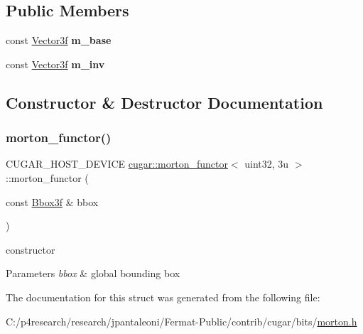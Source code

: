 \subsection*{Public Members}
\begin{DoxyCompactItemize}
\item 
\mbox{\label{structcugar_1_1morton__functor_3_01uint32_00_013u_01_4_acd1acc13bc54e7ed5dc75fe6872ea278}} 
const \hyperlink{structcugar_1_1_vector}{Vector3f} {\bfseries m\+\_\+base}
\item 
\mbox{\label{structcugar_1_1morton__functor_3_01uint32_00_013u_01_4_ad7f31dbe6a8ab5dc44af24459f0d9465}} 
const \hyperlink{structcugar_1_1_vector}{Vector3f} {\bfseries m\+\_\+inv}
\end{DoxyCompactItemize}


\subsection{Constructor \& Destructor Documentation}
\mbox{\label{structcugar_1_1morton__functor_3_01uint32_00_013u_01_4_a6bca6785e96ad7ee48e551cebcbaa48a}} 
\subsubsection{\texorpdfstring{morton\+\_\+functor()}{morton\_functor()}}
{\footnotesize\ttfamily C\+U\+G\+A\+R\+\_\+\+H\+O\+S\+T\+\_\+\+D\+E\+V\+I\+CE \hyperlink{structcugar_1_1morton__functor}{cugar\+::morton\+\_\+functor}$<$ uint32, 3u $>$\+::morton\+\_\+functor (\begin{DoxyParamCaption}\item[{const \hyperlink{structcugar_1_1_bbox}{Bbox3f} \&}]{bbox }\end{DoxyParamCaption})\hspace{0.3cm}{\ttfamily [inline]}}

constructor


\begin{DoxyParams}{Parameters}
{\em bbox} & global bounding box \\
\hline
\end{DoxyParams}


The documentation for this struct was generated from the following file\+:\begin{DoxyCompactItemize}
\item 
C\+:/p4research/research/jpantaleoni/\+Fermat-\/\+Public/contrib/cugar/bits/\hyperlink{morton_8h}{morton.\+h}\end{DoxyCompactItemize}
